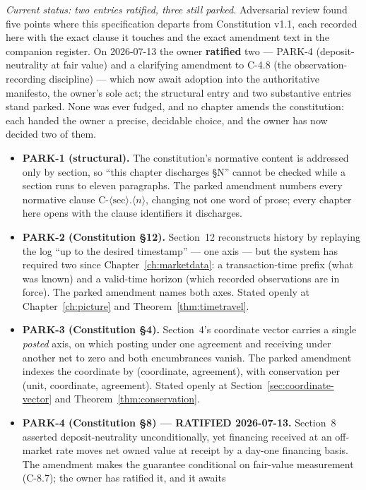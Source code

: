 \emph{Current status: two entries ratified, three still parked.} Adversarial review found
five points where this specification departs from Constitution v1.1, each recorded here with
the exact clause it touches and the exact amendment text in the companion register. On
2026-07-13 the owner \textbf{ratified} two --- PARK-4 (deposit-neutrality at fair value) and a
clarifying amendment to C-4.8 (the observation-recording discipline) --- which now await
adoption into the authoritative manifesto, the owner's sole act; the structural entry and two
substantive entries stand parked. None was ever fudged, and no chapter amends the
constitution: each handed the owner a precise, decidable choice, and the owner has now decided
two of them.

\begin{itemize}
\item \textbf{PARK-1 (structural).} The constitution's normative content is addressed only by
  section, so ``this chapter discharges \S N'' cannot be checked while a section runs to
  eleven paragraphs. The parked amendment numbers every normative clause
  $\mathrm{C}\text{-}\langle\text{sec}\rangle.\langle n\rangle$, changing not one word of prose;
  every chapter here opens with the clause identifiers it discharges.
\item \textbf{PARK-2 (Constitution \S12).} Section~12 reconstructs history by replaying the log
  ``up to the desired timestamp'' --- one axis --- but the system has required two since
  Chapter~\ref{ch:marketdata}: a transaction-time prefix (what was known) and a valid-time
  horizon (which recorded observations are in force). The parked amendment names both axes.
  Stated openly at Chapter~\ref{ch:picture} and Theorem~\ref{thm:timetravel}.
\item \textbf{PARK-3 (Constitution \S4).} Section~4's coordinate vector carries a single
  \emph{posted} axis, on which posting under one agreement and receiving under another net to
  zero and both encumbrances vanish. The parked amendment indexes the coordinate by
  (coordinate, agreement), with conservation per (unit, coordinate, agreement). Stated openly
  at Section~\ref{sec:coordinate-vector} and Theorem~\ref{thm:conservation}.
\item \textbf{PARK-4 (Constitution \S8) --- RATIFIED 2026-07-13.} Section~8 asserted
  deposit-neutrality unconditionally, yet financing received at an off-market rate moves net
  owned value at receipt by a day-one financing basis. The amendment makes the guarantee
  conditional on fair-value measurement (C-8.7); the owner has ratified it, and it awaits

\end{itemize}
